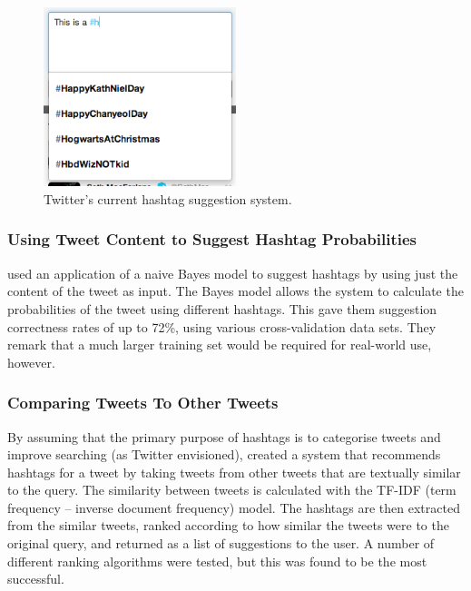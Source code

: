 \documentclass[12pt,a4paper]{article}
\begin{document}
\begin{figure}
    \centering
    \includegraphics[width=0.5\textwidth]{twittersuggest.png}
    \caption{Twitter's current hashtag suggestion system.\label{fig:twittersuggest}}
\end{figure}

\subsubsection{Using Tweet Content to Suggest Hashtag Probabilities}
\textcite{Mazzia:2011} used an application of a naive Bayes model to suggest hashtags by using just the content of the tweet as input. The Bayes model allows the system to calculate the probabilities of the tweet using different hashtags. This gave them suggestion correctness rates of up to 72\%, using various cross-validation data sets. They remark that a much larger training set would be required for real-world use, however.

\subsubsection{Comparing Tweets To Other Tweets}
By assuming that the primary purpose of hashtags is to categorise tweets and improve searching (as Twitter envisioned), \textcite{Zangerle:2011} created a system that recommends hashtags for a tweet by taking tweets from other tweets that are textually similar to the query. The similarity between tweets is calculated with the TF-IDF (term frequency -- inverse document frequency) model. The hashtags are then extracted from the similar tweets, ranked according to how similar the tweets were to the original query, and returned as a list of suggestions to the user. A number of different ranking algorithms were tested, but this was found to be the most successful.
\end{document}
